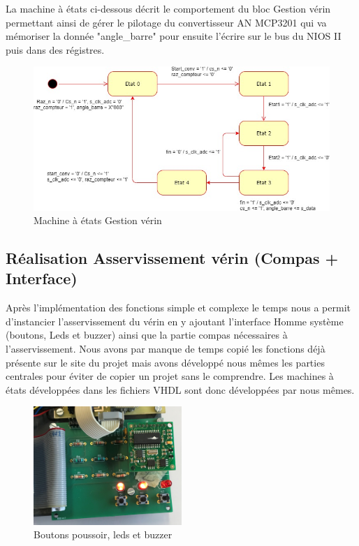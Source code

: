 La machine à états ci-dessous décrit le comportement du bloc Gestion vérin permettant ainsi de gérer le pilotage du convertisseur AN MCP3201 qui va mémoriser la donnée "angle\_barre" pour ensuite l'écrire sur le bus du NIOS II puis dans des régistres.
\vspace{1cm}
  \begin{figure}[h]
    \begin{center}
      \includegraphics[width=\textwidth]{images/MEF_verin.jpg}
      \caption{Machine à états Gestion vérin}
    \end{center}
  \end{figure}

  \newpage
  
\subsection{Réalisation Asservissement vérin (Compas + Interface)}
Après l'implémentation des fonctions simple et complexe le temps nous a permit d'instancier l'asservissement du vérin en y ajoutant l'interface Homme système (boutons, Leds et buzzer) ainsi que la partie compas nécessaires à l'asservissement. Nous avons par manque de temps copié les fonctions déjà présente sur le site du projet mais avons développé nous mêmes les parties centrales pour éviter de copier un projet sans le comprendre. Les machines à états développées dans les fichiers VHDL sont donc développées par nous mêmes. 

\vspace{1cm}
  \begin{figure}[h]
    \begin{center}
      \includegraphics[width=0.5\textwidth]{images/bp.jpg}
      \caption{Boutons poussoir, leds et buzzer}
    \end{center}
  \end{figure}

